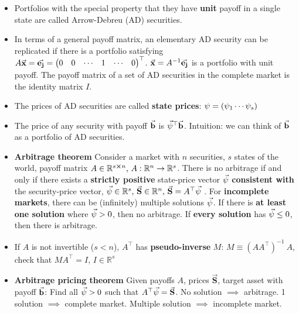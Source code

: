 \documentclass[10pt,landscape,a4paper]{article}
\begin{document}
\begin{multicols*}{3}
\begin{description}[topsep=0pt]
\begin{itemize}[topsep=0pt]
		\item Portfolios with the special property that they have \textbf{unit} payoff in a single
		state are called Arrow-Debreu (AD) securities.
		\item In terms of a general payoff matrix, an elementary AD security can be
		replicated if there is a portfolio satisfying $A \vec{\bf x } = \vec{\bf{e}_j} = \begin{pmatrix}
			0 & 0 & \cdots &1 &  \cdots & 0 
		\end{pmatrix} ^\top$.  $\vec{\bf x } = A^{-1} \vec{\bf{e}_j}$ is a portfolio with unit payoff. The payoff matrix of a set of AD securities in the complete market is the identity matrix $I$.
		\item The prices of AD securities are called \textbf{state prices}: $\psi = (\psi_1 \space \cdots \space \psi_s )$
		\item The price of any security with payoff $\vec{\bf{b}}$ is $\vec{\bf{\psi}}^\top \vec{\bf{b}}$.  Intuition: we can think of  $\vec{\bf{b}}$ as a portfolio of AD securities.
		
		\item \textbf{Arbitrage theorem} Consider a market with $n$ securities, $s$ states of the world, payoff matrix $A \in \mathbb{R}^{s \cross n} \text{, } A: \mathbb{R}^n \rightarrow \mathbb{R}^s$.  There is no arbitrage if and only if there exists a \textbf{strictly positive} state-price
		vector $\vec{\bf{\psi}}$ \textbf{consistent with} the security-price vector, $\vec{\bf{\psi}} \in \mathbb{R}^s \text{, } \vec{\mathbf{S}} \in \mathbb{R}^n \text{, } \vec{\mathbf{S}}=A^\top \vec{\bf{\psi}}$ . 	 For \textbf{incomplete markets}, there
		can be (infinitely) multiple solutions $\vec{\bf{\psi}}$.  If there is \textbf{at least one solution} where $\vec{\bf{\psi}} > 0$, then no arbitrage. If \textbf{every solution} has $\vec{\bf{\psi}} \leq 0$, then there is arbitrage.
		\item If $A$ is not invertible ($s<n$), $A^\top$ has \textbf{pseudo-inverse} $M$: $M \equiv (A A^\top) ^{-1}\ A$, check that $M A ^\top=I$, $ I \in \mathbb{R}^s $
		\item \textbf{Arbitrage pricing theorem} Given payoffs $A$, prices $\vec{\mathbf{S}}$, target asset with payoff $\vec{\bf{b}}$:  Find all $\vec{\bf{\psi}}>0$ such that $A^\top \vec{\bf{\psi}}=\vec{\mathbf{S}}$.  No solution $\implies$ arbitrage. 1 solution $\implies$ complete market. Multiple solution $\implies$ incomplete market.
	
		
	\end{itemize}
\end{description}




\end{multicols*}
\end{document}
